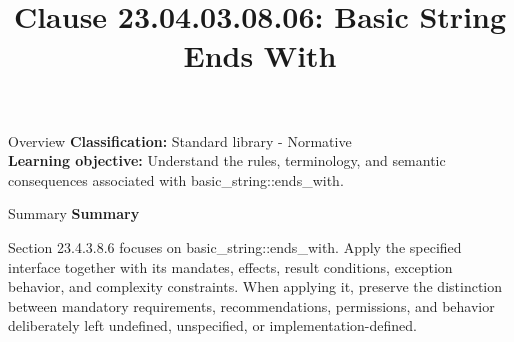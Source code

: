 \documentclass[10pt,letterpaper]{article}
\title{Clause 23.04.03.08.06: Basic String Ends With}
\author{}
\date{}
\begin{document}
\maketitle
\begin{CornellOverviewBox}{Overview}
\textbf{Classification:} Standard library - Normative\\[2pt]
\textbf{Learning objective:} Understand the rules, terminology, and semantic consequences associated with basic\_string::ends\_with.
\end{CornellOverviewBox}\begin{CornellSummaryBox}{Summary}
{\sffamily\bfseries\color{Accent} Summary}\par\vspace{3pt}Section 23.4.3.8.6 focuses on basic\_string::ends\_with. Apply the specified interface together with its mandates, effects, result conditions, exception behavior, and complexity constraints. When applying it, preserve the distinction between mandatory requirements, recommendations, permissions, and behavior deliberately left undefined, unspecified, or implementation-defined.
\end{CornellSummaryBox}
\end{document}
